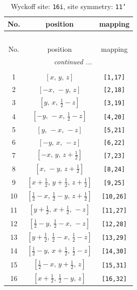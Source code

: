 \documentclass[fleqn,8pt]{jsarticle}
\begin{document}
\begin{longtable}{ccc}
\caption{Wyckoff site: {\tt 16i}, site symmetry: {\tt 11'}}
 \\
 \hline \hline
No. & position & mapping \\ \hline \endfirsthead

\multicolumn{2}{l}{\tablename\ \thetable{}} \\
 \hline \hline
No. & position & mapping \\ \hline \endhead

 \hline \hline
\multicolumn{2}{r}{\footnotesize\it continued ...} \\ \endfoot

 \hline \hline
\multicolumn{2}{r}{} \\ \endlastfoot

1 & $\left[ x,\, y,\, z \right]$ & {\tt [1,17]} \\ \hline
2 & $\left[ - x,\, - y,\, z \right]$ & {\tt [2,18]} \\ \hline
3 & $\left[ y,\, x,\, \frac{1}{2} - z \right]$ & {\tt [3,19]} \\ \hline
4 & $\left[ - y,\, - x,\, \frac{1}{2} - z \right]$ & {\tt [4,20]} \\ \hline
5 & $\left[ y,\, - x,\, - z \right]$ & {\tt [5,21]} \\ \hline
6 & $\left[ - y,\, x,\, - z \right]$ & {\tt [6,22]} \\ \hline
7 & $\left[ - x,\, y,\, z + \frac{1}{2} \right]$ & {\tt [7,23]} \\ \hline
8 & $\left[ x,\, - y,\, z + \frac{1}{2} \right]$ & {\tt [8,24]} \\ \hline
9 & $\left[ x + \frac{1}{2},\, y + \frac{1}{2},\, z + \frac{1}{2} \right]$ & {\tt [9,25]} \\ \hline
10 & $\left[ \frac{1}{2} - x,\, \frac{1}{2} - y,\, z + \frac{1}{2} \right]$ & {\tt [10,26]} \\ \hline
11 & $\left[ y + \frac{1}{2},\, x + \frac{1}{2},\, - z \right]$ & {\tt [11,27]} \\ \hline
12 & $\left[ \frac{1}{2} - y,\, \frac{1}{2} - x,\, - z \right]$ & {\tt [12,28]} \\ \hline
13 & $\left[ y + \frac{1}{2},\, \frac{1}{2} - x,\, \frac{1}{2} - z \right]$ & {\tt [13,29]} \\ \hline
14 & $\left[ \frac{1}{2} - y,\, x + \frac{1}{2},\, \frac{1}{2} - z \right]$ & {\tt [14,30]} \\ \hline
15 & $\left[ \frac{1}{2} - x,\, y + \frac{1}{2},\, z \right]$ & {\tt [15,31]} \\ \hline
16 & $\left[ x + \frac{1}{2},\, \frac{1}{2} - y,\, z \right]$ & {\tt [16,32]} \\
\end{longtable}
\end{document}
